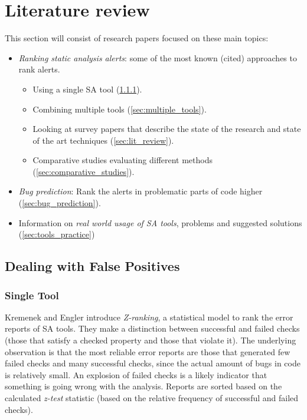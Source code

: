 \section{Literature review}\label{sec:literature}

This section will consist of research papers focused on these main topics: 
\begin{itemize}
    \item \textit{Ranking static analysis alerts}: some of the most known (cited) approaches to rank alerts.
    \begin{itemize}
        \item Using a single SA tool (\cref{sec:single_tool}).
        \item Combining multiple tools  (\cref{sec:multiple_tools}).
        \item Looking at survey papers that describe the state of the research and state of the art techniques (\cref{sec:lit_review}).
        \item Comparative studies evaluating different methods (\cref{sec:comparative_studies}).
    \end{itemize}
    \item \textit{Bug prediction}: Rank the alerts in problematic parts of code higher (\cref{sec:bug_prediction}).
    \item Information on \textit{real world usage of SA tools}, problems and suggested solutions (\cref{sec:tools_practice})
\end{itemize}

 \subsection{Dealing with False Positives}

 \subsubsection{Single Tool}
 \label{sec:single_tool}

 \label{lit:zranking}
 Kremenek and Engler \cite{z-ranking} introduce \textit{Z-ranking}, a statistical model to rank the error reports of SA tools. They make a distinction between successful and failed checks (those that satisfy a checked property and those that violate it). The underlying observation is that the most reliable error reports are those that generated few failed checks and many successful checks, since the actual amount of bugs in code is relatively small. An explosion of failed checks is a likely indicator that something is going wrong with the analysis. Reports are sorted based on the calculated \textit{z-test} statistic (based on the relative frequency of successful and failed checks).

